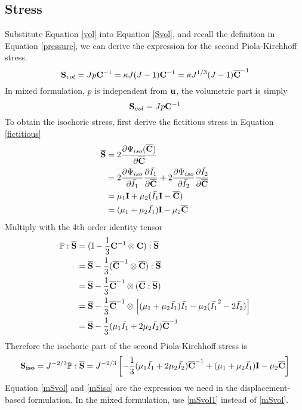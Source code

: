 \subsection{Stress}
Substitute Equation \ref{vol} into Equation \ref{Svol}, and recall the definition in Equation \ref{pressure}, we can derive the expression for the second Piola-Kirchhoff stress.
\begin{equation} \label{mSvol}
\bold{S}_{vol} = Jp\bold{C}^{-1} = \kappa{J(J-1)}\bold{C}^{-1} = \kappa{J^{1/3}(J-1)}\bold{\overline{C}}^{-1}
\end{equation}
In mixed formulation, $p$ is independent from $\bold{u}$, the volumetric part is simply
\begin{equation} \label{mSvol1}
\bold{S}_{vol} = Jp\bold{C}^{-1}
\end{equation}
To obtain the isochoric stress, first derive the fictitious stress in Equation \ref{fictitious}
\begin{equation} \label{mfictitious}
\begin{split}
\overline{\bold{S}} &= 2\frac{\partial\Psi_{iso}({\overline{\bold{C}})}}{\partial\overline{\bold{C}}} \\
&= 2\frac{\partial\Psi_{iso}}{\partial\bar{I_1}} \frac{\partial\bar{I_1}}{\partial\overline{\bold{C}}}  + 2\frac{\partial\Psi_{iso}}{\partial\bar{I_2}} \frac{\partial\bar{I_2}}{\partial\overline{\bold{C}}} \\
&= \mu_1{\bold{I}} + \mu_2({\bar{I_1}\bold{I} - \overline{\bold{C}}}) \\
&= (\mu_1+\mu_2\bar{I_1})\bold{I} - \mu_2{\overline{\bold{C}}}
\end{split}
\end{equation}
Multiply with the 4th order identity tensor
\begin{equation}
\begin{split}
\mathbb{P}:\overline{\bold{S}} &= ( \mathbb{I} - \frac{1}{3}\bold{C}^{-1} \otimes \bold{C} ) : \overline{\bold{S}} \\
&= \overline{\bold{S}} - \frac{1}{3}( \overline{\bold{C}}^{-1} \otimes \overline{\bold{C}} ) : \overline{\bold{S}} \\
&= \overline{\bold{S}} - \frac{1}{3} \overline{\bold{C}}^{-1} \otimes (\overline{\bold{C}} : \overline{\bold{S}}) \\
&= \overline{\bold{S}} - \frac{1}{3} \overline{\bold{C}}^{-1} \otimes \left[(\mu_1+\mu_2\bar{I_1})\bar{I_1} - \mu_2(\bar{I_1}^2-2\bar{I_2})\right]\\
&= \overline{\bold{S}} -  \frac{1}{3}(\mu_1\bar{I_1} + 2\mu_2\bar{I_2}) \overline{\bold{C}}^{-1} 
\end{split}
\end{equation}
Therefore the isochoric part of the second Piola-Kirchhoff stress is
\begin{equation} \label{mSiso}
\bold{S_{iso}} = J^{-2/3}\mathbb{P}:\overline{\bold{S}} = J^{-2/3}\left[    - \frac{1}{3}(\mu_1\bar{I_1} + 2\mu_2\bar{I_2}) \overline{\bold{C}}^{-1}  + (\mu_1 + \mu_2\bar{I_1})\bold{I} - \mu_2\overline{\bold{C}} \right]
\end{equation}
Equation \ref{mSvol} and \ref{mSiso} are the expression we need in the displacement-based formulation. In the mixed formulation, use \ref{mSvol1} instead of \ref{mSvol}.

